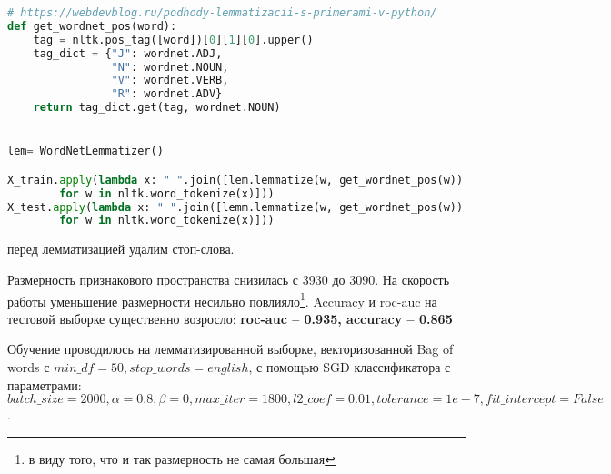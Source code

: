 \documentclass[12pt,fleqn]{article}
\begin{document}
\begin{lstlisting}[language=Python, caption=Lemmatizer,label=code:lemm]
# https://webdevblog.ru/podhody-lemmatizacii-s-primerami-v-python/
def get_wordnet_pos(word):
    tag = nltk.pos_tag([word])[0][1][0].upper()
    tag_dict = {"J": wordnet.ADJ,
                "N": wordnet.NOUN,
                "V": wordnet.VERB,
                "R": wordnet.ADV}
    return tag_dict.get(tag, wordnet.NOUN)


lem= WordNetLemmatizer()

X_train.apply(lambda x: " ".join([lem.lemmatize(w, get_wordnet_pos(w)) 
        for w in nltk.word_tokenize(x)]))
X_test.apply(lambda x: " ".join([lemm.lemmatize(w, get_wordnet_pos(w)) 
        for w in nltk.word_tokenize(x)]))
\end{lstlisting}

 перед лемматизацией удалим стоп-слова.

Размерность признакового пространства снизилась с 3930 до 3090. На скорость работы
уменьшение размерности несильно повлияло\footnote{в виду того, что и так размерность не самая большая}.
Accuracy и roc-auc на тестовой выборке существенно возросло:
\textbf{roc-auc -- 0.935, accuracy -- 0.865}

Обучение проводилось на лемматизированной выборке, векторизованной Bag of words с 
$min\_df=50, stop\_words=english$,
с помощью SGD классификатора с параметрами:\newline
$batch\_size=2000, \alpha = 0.8, \beta = 0, max\_iter=1800, l2\_coef=0.01, tolerance=1e-7,
fit\_intercept=False$.
\end{document}
